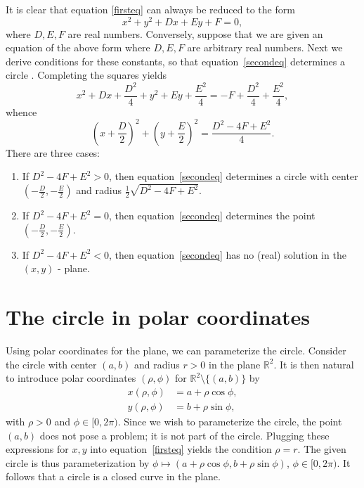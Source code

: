 \documentclass[12pt]{article}
\newcommand{\sR}[0]{\mathbb{R}}
\begin{document}
It is clear that equation \ref{firsteq} can always be reduced to the form
\begin{equation}
\label{secondeq}
x^2 + y^2 + Dx + Ey + F = 0,
\end{equation}
where $D,E,F$ are real numbers. Conversely, suppose that we are given an equation of the above form where $D,E,F$ are
arbitrary real numbers. Next we derive conditions for these constants, so that equation~\eqref{secondeq} determines 
a circle \cite{kindle}. Completing the squares yields
\begin{equation*}
x^2 + Dx + \frac{D^2}{4} + y^2 + Ey + \frac{E^2}{4} =  - F + \frac{D^2}{4} +  \frac{E^2}{4},
\end{equation*}
whence
\begin{equation*}
\left(x + \frac{D}{2}\right)^2 + \left(y + \frac{E}{2}\right)^2 =  \frac{D^2 - 4F + E^2}{4}.
\end{equation*}
There are three cases:
\begin{enumerate}
\item If $D^2 - 4F + E^2 > 0$, then equation~\eqref{secondeq} determines
a circle with center $( - \frac{D}{2}, - \frac{E}{2})$ and radius 
$\frac{1}{2}\sqrt{D^2 - 4F + E^2}$.
\item If $D^2 - 4F + E^2 = 0$, then equation~\eqref{secondeq} determines
the point $( - \frac{D}{2}, - \frac{E}{2})$.
\item If $D^2 - 4F + E^2<0$, then equation~\eqref{secondeq} has no (real)
solution in the $(x,y)$ - plane.
\end{enumerate}

\section{The circle in polar coordinates}

Using polar coordinates for the plane, we can parameterize the circle. Consider the circle with center $(a,b)$ and radius $r > 0$ in the plane $\sR^2$. It is then natural to introduce polar coordinates $(\rho, \phi)$ for $\sR^2\setminus\{(a,b)\}$ by 
\begin{align*}
x(\rho, \phi) & =  a + \rho \cos \phi, \\
y(\rho, \phi) & =  b + \rho \sin \phi,
\end{align*}
with $\rho > 0$ and $\phi\in [0,2\pi)$. Since we wish to parameterize the circle, the point $(a,b)$ does not pose a problem; it is not part of the circle. Plugging these expressions for $x,y$ into 
equation~\eqref{firsteq} yields the condition $\rho = r$. 
The given circle is thus parameterization by $\phi\mapsto (a + \rho \cos \phi, b + \rho \sin \phi)$, $\phi\in[0,2\pi)$. It follows that a circle is a closed curve in the plane. 
\end{document}
